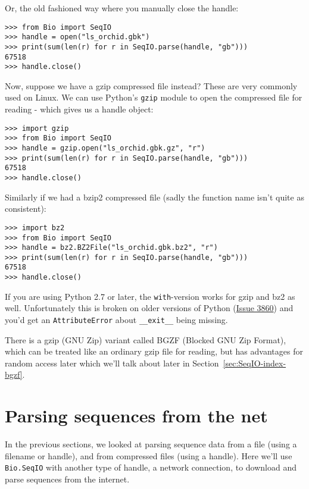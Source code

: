 \documentclass{report}
\begin{document}
\noindent
Or, the old fashioned way where you manually close the handle:

\begin{verbatim}
>>> from Bio import SeqIO
>>> handle = open("ls_orchid.gbk")
>>> print(sum(len(r) for r in SeqIO.parse(handle, "gb")))
67518
>>> handle.close()
\end{verbatim}

Now, suppose we have a gzip compressed file instead? These are very
commonly used on Linux. We can use Python's \verb|gzip| module to open
the compressed file for reading - which gives us a handle object:

\begin{verbatim}
>>> import gzip
>>> from Bio import SeqIO
>>> handle = gzip.open("ls_orchid.gbk.gz", "r")
>>> print(sum(len(r) for r in SeqIO.parse(handle, "gb")))
67518
>>> handle.close()
\end{verbatim}

Similarly if we had a bzip2 compressed file (sadly the function name isn't
quite as consistent):

\begin{verbatim}
>>> import bz2
>>> from Bio import SeqIO
>>> handle = bz2.BZ2File("ls_orchid.gbk.bz2", "r")
>>> print(sum(len(r) for r in SeqIO.parse(handle, "gb")))
67518
>>> handle.close()
\end{verbatim}

\noindent
If you are using Python 2.7 or later, the \verb|with|-version works for
gzip and bz2 as well. Unfortunately this is broken on older versions of
Python (\href{http://bugs.python.org/issue3860}{Issue 3860}) and you'd
get an \verb|AttributeError| about \verb|__exit__| being missing.

There is a gzip (GNU Zip) variant called BGZF (Blocked GNU Zip Format),
which can be treated like an ordinary gzip file for reading, but has
advantages for random access later which we'll talk about later in
Section~\ref{sec:SeqIO-index-bgzf}.

\section{Parsing sequences from the net}
\label{sec:SeqIO_Online}
In the previous sections, we looked at parsing sequence data from a file
(using a filename or handle), and from compressed files (using a handle).
Here we'll use \verb|Bio.SeqIO| with another type of handle, a network
connection, to download and parse sequences from the internet.
\end{document}
